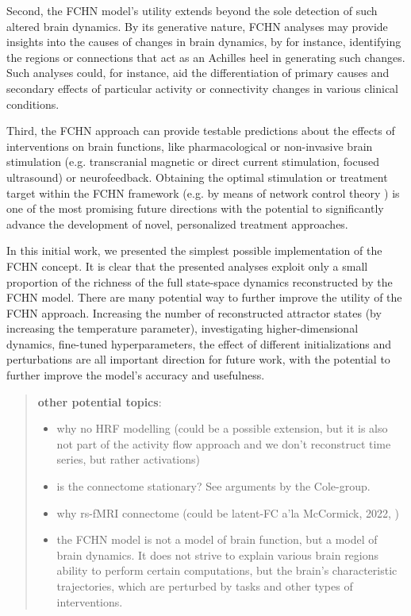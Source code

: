 \documentclass{article}
\begin{document}
Second, the FCHN model's utility extends beyond the sole detection of such altered brain dynamics. By its generative nature, FCHN analyses may provide insights into the causes of changes in brain dynamics, by for instance, identifying the regions or connections that act as an Achilles heel in generating such changes. Such analyses could, for instance, aid the differentiation of primary causes and secondary effects of particular activity or connectivity changes in various clinical conditions.

Third, the FCHN approach can provide testable predictions about the effects of interventions on brain functions, like pharmacological or non-invasive brain stimulation (e.g. transcranial magnetic or direct current stimulation,
focused ultrasound) or neurofeedback. Obtaining the optimal stimulation or treatment target within the FCHN framework (e.g. by means of network control theory \citep{liu2011controllability}) is one of the most promising future directions with the potential to significantly advance the development of novel, personalized treatment approaches.

In this initial work, we presented the simplest possible implementation of the FCHN concept. It is clear that the presented analyses exploit only a small proportion of the richness of the full state-space dynamics reconstructed by the FCHN model.
There are many potential way to further improve the utility of the FCHN approach. Increasing the number of reconstructed attractor states (by increasing the temperature parameter), investigating higher-dimensional dynamics, fine-tuned hyperparameters, the effect of
different initializations and perturbations are all important direction for future work, with the potential to further improve the model's accuracy and usefulness.

\begin{quote}
\textbf{other potential topics}:

\begin{itemize}
\item why no HRF modelling (could be a possible extension, but it is also not part of the activity flow approach and we don't reconstruct time series, but rather activations)
\item is the connectome stationary? See arguments by the Cole-group.
\item why rs-fMRI connectome (could be latent-FC a'la McCormick, 2022, \cite{McCormick_2022})
\item the FCHN model is not a model of brain function, but a model of brain dynamics. It does not strive to explain various brain regions ability to perform certain computations, but the brain's characteristic trajectories, which are perturbed by tasks and other types of interventions.
\end{itemize}
\end{quote}
\end{document}
